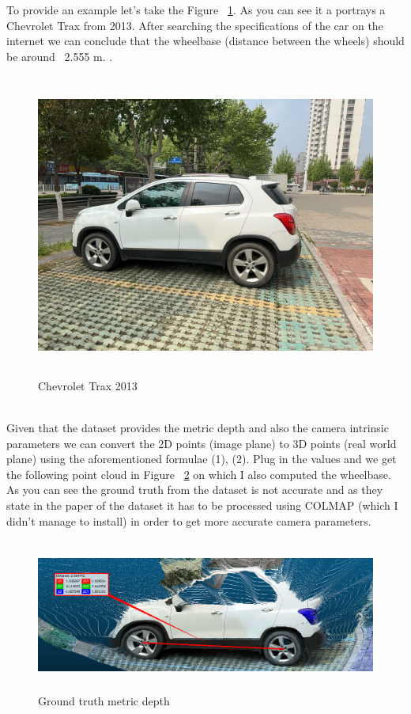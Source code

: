 \documentclass{article}
\begin{document}
\tab \tab To provide an example let's take the Figure ~\ref{fig:mock_image}. As you can see it a portrays a Chevrolet Trax from 2013. After searching the specifications of the car on the internet we can conclude that the wheelbase (distance between the wheels) should be around ~2.555 m. \cite{https://www.auto-data.net/en/chevrolet-trax-i-1.6-115hp-17821}. 
\begin{figure}[!ht]
\includegraphics[width=12cm,height=10cm,keepaspectratio]{images/frame_00136.jpg}
\caption{Chevrolet Trax 2013}
\label{fig:mock_image}
\end{figure}\\
\tab \tab Given that the dataset provides the metric depth and also the camera intrinsic parameters we can convert the 2D points (image plane) to 3D points (real world plane) using the aforementioned formulae (1), (2). Plug in the values and we get the following point cloud in Figure ~\ref{fig:point_cloud_gt} on which I also computed the wheelbase. As you can see the ground truth from the dataset is not accurate and as they state in the paper of the dataset \cite{du20243drealcar} it has to be processed using COLMAP (which I didn't manage to install) in order to get more accurate camera parameters.
\begin{figure}[!ht]
\includegraphics[width=12cm,height=5cm,keepaspectratio]{images/ground_truth_metric_depth.png}
\caption{Ground truth metric depth}
\label{fig:point_cloud_gt}
\end{figure}\\
\end{document}
